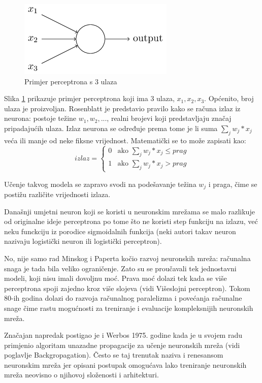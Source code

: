 \documentclass[times, utf8, diplomski, numeric]{fer}
\begin{document}
\begin{figure}[htb]
\centering
\includegraphics{imgs/percep.png}
\caption{Primjer perceptrona s 3 ulaza}
\label{fig:percep}
\end{figure}

Slika \ref{fig:percep} prikazuje primjer perceptrona koji ima 3 ulaza, $x_1, x_2, x_3$. Općenito, broj ulaza je proizvoljan. Rosenblatt je predstavio pravilo kako se računa izlaz iz neurona: postoje težine $w_1, w_2, ...$, realni brojevi koji predstavljaju značaj pripadajućih ulaza. Izlaz neurona se određuje prema tome je li suma $\sum_{j} w_j * x_j$ veća ili manje od neke fiksne vrijednost. Matematički se to može zapisati kao:
\begin{equation}
izlaz =
\left\{
	\begin{array}{ll}
		0  & \mbox{ako } \sum_j w_j * x_j \leq prag \\
		1  & \mbox{ako } \sum_j w_j * x_j >  prag
	\end{array}
\right.
\end{equation}

Učenje takvog modela se zapravo svodi na podešavanje težina $w_j$ i praga, čime se postižu različite vrijednosti izlaza.

Današnji umjetni neuron koji se koristi u neuronskim mrežama se malo razlikuje od originalne ideje perceptrona po tome što ne koristi step funkciju na izlazu, već neku funckciju iz porodice sigmoidalnih funkcija (neki autori takav neuron nazivaju logistički neuron ili logistički perceptron).

No, nije samo rad Minskog i Paperta kočio razvoj neuronskih mreža: računalna snaga je tada bila veliko ograničenje. Zato su se proučavali tek jednostavni modeli, koji nisu imali dovoljnu moć. Prava moć dolazi tek kada se više perceptrona spoji zajedno kroz više slojeva (vidi Višeslojni perceptron). Tokom 80-ih godina dolazi do razvoja računalnog paralelizma i povećanja računalne snage čime rastu mogućnosti za treniranje i evaluacije kompleksnijih neuronskih mreža.

Značajan napredak postigao je i Werbos 1975. godine kada je u svojem radu \cite{Werbos:74} primjenio algoritam unazadne propagacije  za učenje neuronskih mreža (vidi poglavlje Backgropagation).
Često se taj trenutak naziva i renesansom neuronskim mreža jer opisani postupak omogućava lako treniranje neuronskih mreža neovisno o njihovoj složenosti i arhitekturi.
\end{document}
